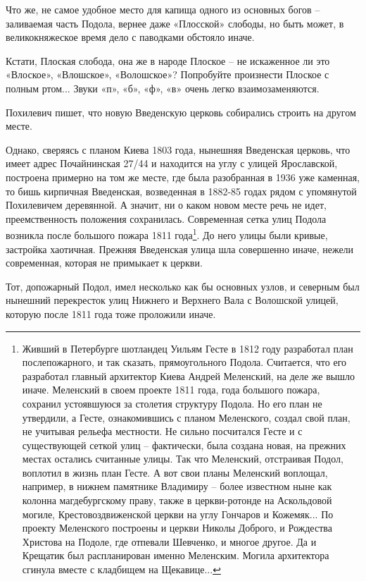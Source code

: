 \documentclass[a5paper,11pt,openany]{article}
\begin{document}
Что же, не самое удобное место для капища одного из основных богов – заливаемая часть Подола, вернее даже «Плосской» слободы, но быть может, в великокняжеское время дело с паводками обстояло иначе.

Кстати, Плоская слобода, она же в народе Плоское – не искаженное ли это «Влоское», «Влошское», «Волошское»? Попробуйте произнести Плоское с полным ртом... Звуки «п», «б», «ф», «в» очень легко взаимозаменяются.

Похилевич пишет, что новую Введенскую церковь собирались строить на другом месте.

Однако, сверяясь с планом Киева 1803 года,
нынешняя Введенская церковь, что имеет адрес Почайнинская 27/44 и находится на углу с улицей Ярославской, построена примерно на том же месте, где была разобранная в 1936 уже каменная, то бишь кирпичная Введенская, возведенная в 1882-85 годах рядом с упомянутой Похилевичем деревянной. А значит, ни о каком новом месте речь не идет, 
преемственность положения сохранилась.
Современная сетка улиц Подола возникла после большого пожара 1811 года\footnote{Живший в Петербурге шотландец Уильям Гесте в 1812 году разработал план послепожарного, и так сказать, прямоугольного Подола. Считается, что его разработал главный архитектор Киева Андрей Меленский, на деле же вышло иначе. Меленский в своем проекте 1811 года, года большого пожара, сохранил устоявшуюся за столетия структуру Подола. Но его план не утвердили, а Гесте, ознакомившись с планом Меленского, создал свой план, не учитывая рельефа местности. Не сильно посчитался Гесте и с существующей сеткой улиц – фактически, была создана новая, на прежних местах остались считанные улицы. Так что Меленский, отстраивая Подол, воплотил в жизнь план Гесте. А вот свои планы Меленский воплощал, например, в нижнем памятнике Владимиру – более известном ныне как колонна магдебургскому праву, также в церкви-ротонде на Аскольдовой могиле, Крестовоздвиженской церкви на углу Гончаров и Кожемяк... По проекту Меленского построены и церкви Николы Доброго, и Рождества Христова на Подоле, где отпевали Шевченко, и многое другое. Да и Крещатик был распланирован именно Меленским. Могила архитектора сгинула вместе с кладбищем на Щекавице...}. До него улицы были кривые, застройка хаотичная. Прежняя Введенская улица шла совершенно иначе, нежели современная, которая не примыкает к церкви.

Тот, допожарный Подол, имел несколько как бы основных узлов, и северным был нынешний перекресток улиц Нижнего и Верхнего Вала с Волошской улицей, которую после 1811 года тоже проложили иначе. 
\end{document}
